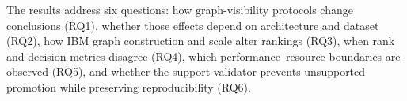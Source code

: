 The results address six questions: how graph-visibility protocols change conclusions (RQ1), whether those effects depend on architecture and dataset (RQ2), how IBM graph construction and scale alter rankings (RQ3), when rank and decision metrics disagree (RQ4), which performance--resource boundaries are observed (RQ5), and whether the support validator prevents unsupported promotion while preserving reproducibility (RQ6).
